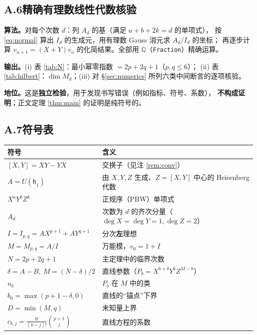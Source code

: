 \documentclass[11pt,UTF8]{ctexart}
\theoremstyle{definition}
\newcommand{\Q}{\mathbb{Q}}
\newcommand{\hh}{\mathfrak{h}}
\begin{document}
\subsection*{A.6\quad 精确有理数线性代数核验}

\noindent\textbf{算法。}对每个次数 $d$：列 $A_d$ 的基（满足 $a+b+2k=d$ 的单项式），
按 \eqref{eq:normal} 算出 $I_d$ 的生成元，用有理数 Gauss 消元求 $A_d/I_d$ 的坐标；
再逐步计算 $v_{n+1}=(X+Y)v_n$ 的化简结果。全部用 $\Q$（\texttt{Fraction}）精确运算。

\noindent\textbf{输出。}(i) 表 \ref{tab:N}：最小幂零指数 $=2p+2q+1$（$p,q\le6$）；
(ii) 表 \ref{tab:hilbert}：$\dim M_d$；(iii) 对 \S\ref{sec:numerics} 所列六类中间断言的逐项核验。

\noindent\textbf{地位。}这是\textbf{独立检验}，用于发现书写错误（例如指标、符号、系数），
\textbf{不构成证明}；正文定理 \ref{thm:main} 的证明是纯符号的。

\subsection*{A.7\quad 符号表}

\begin{center}
\begin{tabular}{ll}
\toprule
符号 & 含义\\
\midrule
$[X,Y]=XY-YX$ & 交换子（见注 \ref{rem:conv}）\\
$A=U(\hh_1)$ & 由 $X,Y,Z$ 生成、$Z=[X,Y]$ 中心的 Heisenberg 代数\\
$X^aY^bZ^k$ & 正规序（PBW）单项式\\
$A_d$ & 次数为 $d$ 的齐次分量（$\deg X=\deg Y=1,\deg Z=2$）\\
$I=I_{p,q}=AX^{p+1}+AY^{q+1}$ & 分次\textbf{左}理想\\
$M=M_{p,q}=A/I$ & 万能模，$v_0=1+I$\\
$N=2p+2q+1$ & 主定理中的临界次数\\
$\delta=A-B,\ M=(N-\delta)/2$ & 直线参数（$P_b=X^{b+\delta}Y^bZ^{M-b}$）\\
$u_b$ & $P_b$ 在 $M$ 中的类\\
$b_0=\max(p+1-\delta,0)$ & 直线的“锚点”下界\\
$D=\min(M,q)$ & 未知量上界\\
$c_{b,j}=\frac{b!}{(b-j)!}\binom{p+1}{j}$ & 直线方程的系数\\
\bottomrule
\end{tabular}
\end{center}
\end{document}
